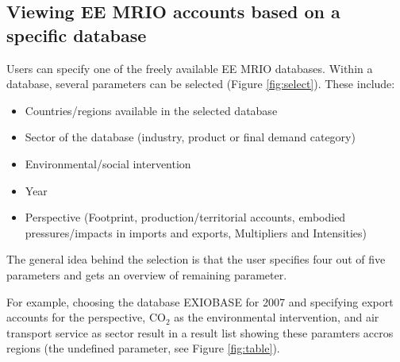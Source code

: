 \subsection{Viewing EE MRIO accounts based on a specific database}

Users can specify one of the freely available EE MRIO databases. 
Within a database, several parameters can be selected (Figure \ref{fig:select}). These include:

\begin{itemize}
    \item Countries/regions available in the selected database
    \item Sector of the database (industry, product or final demand category)
    \item Environmental/social intervention
    \item Year
    \item Perspective (Footprint, production/territorial accounts, embodied
      pressures/impacts in imports and exports, Multipliers and Intensities)
\end{itemize}


The general idea behind the selection is that the user specifies four out
of five parameters and gets an overview of remaining parameter.

For example, choosing the database EXIOBASE for 2007 and specifying export accounts for the perspective, $\text{CO}_2$ as the environmental intervention, and air transport service as sector result in a result list showing these paramters accros regions (the undefined parameter, see Figure \ref{fig:table}).